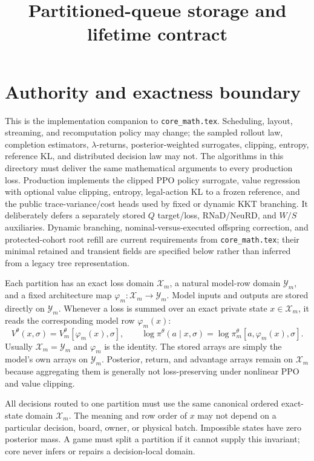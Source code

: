 \documentclass[10pt,a4paper]{article}
\title{Partitioned-queue storage and lifetime contract}
\author{}
\date{}
\begin{document}
\maketitle

\section{Authority and exactness boundary}

This is the implementation companion to \texttt{core\_math.tex}.  Scheduling,
layout, streaming, and recomputation policy may change; the sampled
rollout law, completion estimators, $\lambda$-returns, posterior-weighted
surrogates, clipping, entropy, reference KL, and distributed decision law may
not.  The algorithms in this directory must deliver the same mathematical
arguments to every production loss.  Production implements the clipped PPO
policy surrogate, value regression with optional value clipping, entropy,
legal-action KL to a frozen reference, and the public trace-variance/cost heads
used by fixed or dynamic KKT branching.  It deliberately defers a separately
stored $Q$ target/loss, RNaD/NeuRD, and $W/S$ auxiliaries.  Dynamic branching,
nominal-versus-executed offspring correction, and protected-cohort root refill
are current requirements from \texttt{core\_math.tex}; their minimal retained
and transient fields are specified below rather than inferred from a legacy
tree representation.

Each partition has an exact loss domain $\mathcal X_m$, a natural model-row
domain $\mathcal Y_m$, and a fixed architecture map
$\varphi_m:\mathcal X_m\to\mathcal Y_m$.  Model inputs and outputs are stored
directly on $\mathcal Y_m$.  Whenever a loss is summed over an exact private
state $x\in\mathcal X_m$, it reads the corresponding model row
$\varphi_m(x)$:
\[
 V^\theta(x,\sigma)=V^\theta_m[\varphi_m(x),\sigma],
 \qquad
 \log\pi^\theta(a\mid x,\sigma)
 =\log\pi^\theta_m[a,\varphi_m(x),\sigma].
\]
Usually $\mathcal X_m=\mathcal Y_m$ and $\varphi_m$ is the identity.  The
stored arrays are simply the model's own arrays on $\mathcal Y_m$.
Posterior, return, and advantage arrays remain on
$\mathcal X_m$ because aggregating them is generally not loss-preserving under
nonlinear PPO and value clipping.

All decisions routed to one partition must use the same canonical ordered
exact-state domain $\mathcal X_m$.  The meaning and row order of $x$ may not
depend on a particular decision, board, owner, or physical batch.  Impossible
states have zero posterior mass.  A game must split a partition if it cannot
supply this invariant; core never infers or repairs a decision-local domain.
\end{document}
